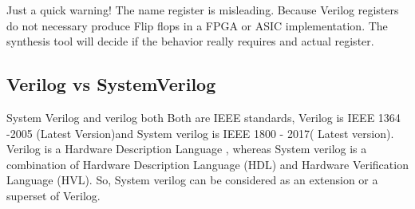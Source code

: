 Just a quick warning! The name register is misleading. Because Verilog registers do not necessary produce Flip flops in a FPGA or ASIC implementation. The synthesis tool will decide if the behavior really requires and actual register.
\fi

\subsection{Verilog vs SystemVerilog} 

System Verilog and verilog both Both are IEEE standards, Verilog is IEEE 1364 -2005 (Latest Version)and System verilog is IEEE 1800 - 2017( Latest version). Verilog is a Hardware Description Language , whereas System verilog is a combination of Hardware Description Language (HDL) and Hardware Verification Language (HVL). So, System verilog can be considered as an extension or a superset of Verilog.

